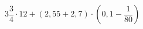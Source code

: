 \begin{ex}[type=calculate]
	\begin{condition}
		\( 3\dfrac{3}{4}\cdot12+(2,55+2,7)\cdot\left( 0,1-\dfrac{1}{80} \right) \)
	\end{condition}
	\answer{}
\end{ex}